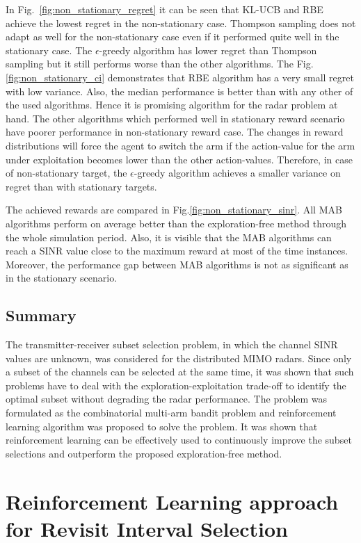 \documentclass[english, 12pt, a4paper, elec, utf8, a-1b, online]{aaltothesis}
\begin{document}
In Fig.~\ref{fig:non_stationary_regret} it can be seen that KL-UCB and RBE achieve the lowest regret in the non-stationary case.
Thompson sampling does not adapt as well for the non-stationary case even if it performed quite well in the stationary case.
The $\epsilon$-greedy algorithm has lower regret than Thompson sampling but it still performs worse than the other algorithms. 
The Fig.\ref{fig:non_stationary_ci} demonstrates that RBE algorithm has a very small regret with low variance.
Also, the median performance is better than with any other of the used algorithms.
Hence it is promising algorithm for the radar problem at hand. 
The other algorithms which performed well in stationary reward scenario have poorer performance in non-stationary reward case.
The changes in reward distributions will force the agent to switch the arm if the action-value for the arm under exploitation becomes lower than the other action-values.
Therefore, in case of non-stationary target, the $\epsilon$-greedy algorithm achieves a smaller variance on regret than with stationary targets.

The achieved rewards are compared in Fig.\ref{fig:non_stationary_sinr}.
All MAB algorithms perform on average better than the exploration-free method through the whole simulation period.
Also, it is visible that the MAB algorithms can reach a SINR value close to the maximum reward at most of the time instances. 
Moreover, the performance gap between MAB algorithms is not as significant as in the stationary scenario.

\subsection{Summary}
\label{sec:tx_rx_summary}
The transmitter-receiver subset selection problem, in which the channel SINR values are unknown, was considered for the distributed MIMO radars.
Since only a subset of the channels can be selected at the same time, it was shown that such problems have to deal with the exploration-exploitation trade-off to identify the optimal subset without degrading the radar performance.
The problem was formulated as the combinatorial multi-arm bandit problem and reinforcement learning algorithm was proposed to solve the problem.
It was shown that reinforcement learning can be effectively used to continuously improve the subset selections and outperform the proposed exploration-free method.



\newpage
\section{Reinforcement Learning approach for Revisit Interval Selection}\label{sec:rl_ri}
\end{document}
